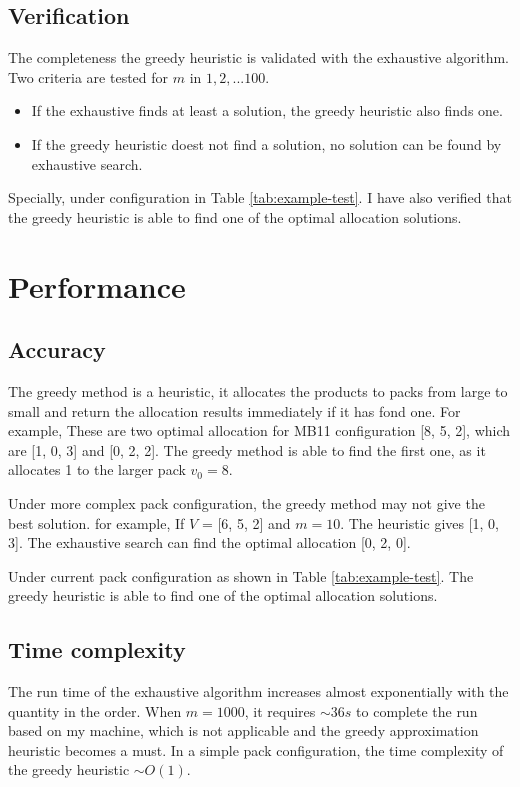 \documentclass[a4paper]{article}
\begin{document}
\subsection{Verification}

The completeness the greedy heuristic is validated with the exhaustive algorithm. Two criteria are tested for $m$ in $1, 2, ... 100$.
\begin{itemize}
\item If the exhaustive finds at least a solution, the greedy heuristic also finds one. \item If the greedy heuristic doest not find a solution, no solution can be found by exhaustive search.
\end{itemize}

Specially, under configuration in Table {\ref{tab:example-test}}. I have also verified that the greedy heuristic is able to find one of the optimal allocation solutions.


\section{Performance}

\subsection{Accuracy}

The greedy method is a heuristic, it allocates the products to packs from large to small and return the allocation results immediately if it has fond one. For example, These are two optimal allocation for MB11 configuration [8, 5, 2], which are [1, 0, 3] and [0, 2, 2]. The greedy method is able to find the first one, as it allocates 1 to the larger pack $v_0=8$.

Under more complex pack configuration, the greedy method may not give the best solution. for example, If $V$ = [6, 5, 2] and $m=10$. The heuristic gives [1, 0, 3]. The exhaustive search can find the optimal allocation [0, 2, 0].

Under current pack configuration as shown in Table {\ref{tab:example-test}}. The greedy heuristic is able to find one of the optimal allocation solutions.

\subsection{Time complexity}
The run time of the exhaustive algorithm increases almost exponentially with the quantity in the order. When $m=1000$, it requires $\sim 36s$ to complete the run based on my machine, which is not applicable and the greedy approximation heuristic becomes a must. In a simple pack configuration, the time complexity of the greedy heuristic $\sim O(1)$.
\end{document}
